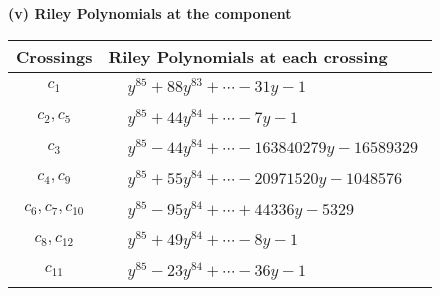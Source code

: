 \documentclass[1p]{elsarticle_modified}
\theoremstyle{definition}
\begin{document}
\flushleft \textbf{(v) Riley Polynomials at the component}\newline \\
\begin{tabular}{m{50pt}|m{274pt}}
Crossings & \hspace{64pt}Riley Polynomials at each crossing \\
\hline $$\begin{aligned}c_{1}\end{aligned}$$&$\begin{aligned}
&y^{85}+88 y^{83}+\cdots-31 y-1
\end{aligned}$\\
\hline $$\begin{aligned}c_{2},c_{5}\end{aligned}$$&$\begin{aligned}
&y^{85}+44 y^{84}+\cdots-7 y-1
\end{aligned}$\\
\hline $$\begin{aligned}c_{3}\end{aligned}$$&$\begin{aligned}
&y^{85}-44 y^{84}+\cdots-163840279 y-16589329
\end{aligned}$\\
\hline $$\begin{aligned}c_{4},c_{9}\end{aligned}$$&$\begin{aligned}
&y^{85}+55 y^{84}+\cdots-20971520 y-1048576
\end{aligned}$\\
\hline $$\begin{aligned}c_{6},c_{7},c_{10}\end{aligned}$$&$\begin{aligned}
&y^{85}-95 y^{84}+\cdots+44336 y-5329
\end{aligned}$\\
\hline $$\begin{aligned}c_{8},c_{12}\end{aligned}$$&$\begin{aligned}
&y^{85}+49 y^{84}+\cdots-8 y-1
\end{aligned}$\\
\hline $$\begin{aligned}c_{11}\end{aligned}$$&$\begin{aligned}
&y^{85}-23 y^{84}+\cdots-36 y-1
\end{aligned}$\\
\hline
\end{tabular}\\~\\
\end{document}
